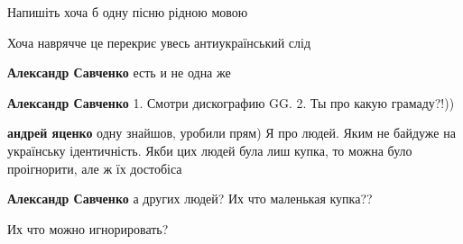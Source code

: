 \begin{itemize}
Напишіть хоча б одну пісню рідною мовою

Хоча наврячче це перекриє увесь антиукраїнський слід

\begin{itemize}
 
\textbf{Александр Савченко} есть и не одна же

 
\textbf{Александр Савченко} 1. Смотри дискографию GG.
2. Ты про какую грамаду?!))

 
\textbf{андрей яценко} одну знайшов, уробили прям)
Я про людей. Яким не байдуже на українську ідентичність. Якби цих людей була лиш купка, то можна було проігнорити, але ж їх достобіса

 
\textbf{Александр Савченко} а других людей? Их что маленькая купка??

 
Их что можно игнорировать?

 

\end{itemize}
\end{itemize}
